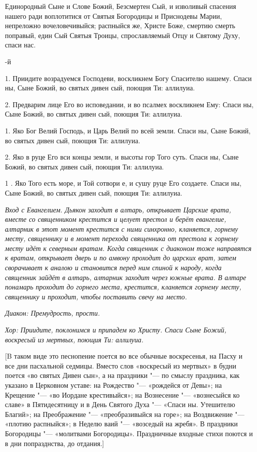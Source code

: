 Единородный Сыне и Слове Божий, Безсмертен Сый, и изволивый спасения нашего ради воплотитися от Святыя Богородицы и Приснодевы Марии, непреложно вочеловечивыйся; распныйся же, Христе Боже, смертию смерть поправый, един Сый Святыя Троицы, спрославляемый Отцу и Святому Духу, спаси нас. 

-й 


1. Приидите возрадуемся Господеви, воскликнем Богу Спасителю нашему. Спаси ны, Сыне Божий, во святых дивен сый, поющия Ти: аллилуиа. 


2. Предварим лице Его во исповедании, и во псалмех воскликнем Ему: Спаси ны, Сыне Божий, во святых дивен сый, поющия Ти: аллилуиа. 


1. Яко Бог Велий Господь, и Царь Велий по всей земли. Спаси ны, Сыне Божий, во святых дивен сый, поющия Ти: аллилуиа. 


2. Яко в руце Его вси концы земли, и высоты гор Того суть. Спаси ны, Сыне Божий, во святых дивен сый, поющия Ти: аллилуиа. 


1 . Яко Того есть море, и Той сотвори е, и сушу руце Его создаете. Спаси ны, Сыне Божий, во святых дивен сый, поющия Ти: аллилуиа. 


\itshape Вход с Евангелием. Дьякон заходит в алтарь, открывает Царские врата, вместе со священником крестится и целует престол и берёт евангелие, алтарник в этот момент крестится с ними синхронно, кланяется, горнему месту, священнику и в момент перехода священника от престола к горнему месту идёт к северным вратам. Когда священник с диаконом тоже направятся к вратам, открывает дверь и по амвону проходит до царских врат, затем сворачивает к аналою и становится перед ним спиной к народу, когда священник зайдёт в алтарь, алтарник заходит через южные врата. В алтаре понамарь проходит до горнего места, крестится, кланяется горнему месту, священнику и проходит, чтобы поставить свечу на место.\normalfont{}




\itshape Диакон:\normalfont{} Премудрость, прости.


\itshape  Хор:\normalfont{} Приидите, поклонимся и припадем ко Христу. Спаси Сыне Божий, воскресый из мертвых, поющия Ти: аллилуиа.


[B таком виде это песнопение поется во все обычные воскресенья, на Пасху и все дни пасхальной седмицы. Вместо слов «воскресый из мертвых» в будни поется «во святых Дивен сын», а на праздники "--- по смыслу праздника, как указано в Церковном уставе: на Рождество "--- «рождейся от Девы»; на Крещение "--- «во Иордане крестивыйся»; на Вознесение "--- «вознесыйся ко славе» в Пятидесятницу и в День Святого Духа "--- «Спаси ны. Утешителю Благий»; на Преображение "--- «преобразивыйся на горе»; на Воздвижение "--- «плотию распныйся»; в Неделю ваий "--- «возседый на жребя». В праздники Богородицы "--- «молитвами Богородицы». Праздничные входные стихи поются и в дни попразднства, до отдания.]


